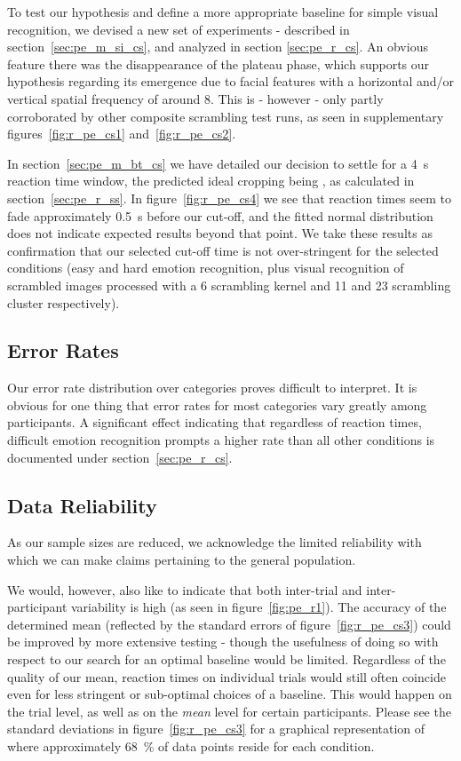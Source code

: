 	    To test our hypothesis and define a more appropriate baseline for simple visual recognition, we devised a new set of experiments - described in section~\ref{sec:pe_m_si_cs}, and analyzed in section \ref{sec:pe_r_cs}.
	    An obvious feature there was the disappearance of the plateau phase, which supports our hypothesis regarding its emergence due to facial features with a horizontal and/or vertical spatial frequency of around \SI{8}{\pixel}.
	    This is - however - only partly corroborated by other composite scrambling test runs, as seen in supplementary figures~\ref{fig:r_pe_cs1} and~\ref{fig:r_pe_cs2}.
	    
	    In section~\ref{sec:pe_m_bt_cs} we have detailed our decision to settle for a \SI{4}{\second} reaction time window, the predicted ideal cropping being , as calculated in section~\ref{sec:pe_r_ss}.
	    In figure~\ref{fig:r_pe_cs4} we see that reaction times seem to fade approximately \SI{0.5}{\second} before our cut-off, and the fitted normal distribution does not indicate expected results beyond that point.
	    We take these results as confirmation that our selected cut-off time is not over-stringent for the selected conditions (easy and hard emotion recognition, plus visual recognition of scrambled images processed with a \SI{6}{\pixel} scrambling kernel and \SI{11}{\pixel} and \SI{23}{\pixel} scrambling cluster respectively).
	\subsection{Error Rates}
	    Our error rate distribution over categories proves difficult to interpret.
	    It is obvious for one thing that error rates for most categories vary greatly among participants.
	    A significant effect indicating that regardless of reaction times, difficult emotion recognition prompts a higher rate than all other conditions is documented under section~\ref{sec:pe_r_cs}.
	\subsection{Data Reliability}
	    As our sample sizes are reduced, we acknowledge the limited reliability with which we can make claims pertaining to the general population. 
	
	    We would, however, also like to indicate that both inter-trial and inter-participant variability is high (as seen in figure~\ref{fig:pe_r1}).
	    The accuracy of the determined mean (reflected by the standard errors of figure~\ref{fig:r_pe_cs3}) could be improved by more extensive testing - though the usefulness of doing so with respect to our search for an optimal baseline would be limited.
	    Regardless of the quality of our mean, reaction times on individual trials would still often coincide even for less stringent or sub-optimal choices of a baseline.  
	    This would happen on the trial level, as well as on the \textit{mean} level for certain participants.
	    Please see the standard deviations in figure~\ref{fig:r_pe_cs3} for a graphical representation of where approximately \SI{68}{\percent} of data points reside for each condition.
